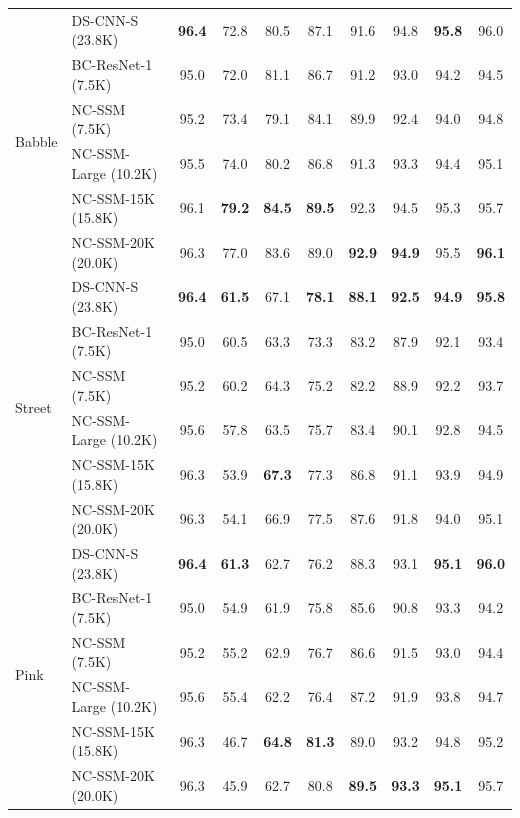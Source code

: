 \documentclass[journal]{IEEEtran}
\begin{document}
\begin{table}[t]
\begin{tabular}{ll|cccccccc}
\midrule
\multirow{6}{*}{Babble}
  & DS-CNN-S (23.8K)       & \textbf{96.4} & 72.8 & 80.5 & 87.1 & 91.6 & 94.8 & \textbf{95.8} & 96.0 \\
  & BC-ResNet-1 (7.5K)     & 95.0 & 72.0 & 81.1 & 86.7 & 91.2 & 93.0 & 94.2 & 94.5 \\
\cmidrule{2-10}
  & NC-SSM (7.5K)          & 95.2 & 73.4 & 79.1 & 84.1 & 89.9 & 92.4 & 94.0 & 94.8 \\
  & NC-SSM-Large (10.2K)   & 95.5 & 74.0 & 80.2 & 86.8 & 91.3 & 93.3 & 94.4 & 95.1 \\
  & NC-SSM-15K (15.8K) & 96.1 & \textbf{79.2} & \textbf{84.5} & \textbf{89.5} & 92.3 & 94.5 & 95.3 & 95.7 \\
  & NC-SSM-20K (20.0K) & 96.3 & 77.0 & 83.6 & 89.0 & \textbf{92.9} & \textbf{94.9} & 95.5 & \textbf{96.1} \\
\midrule
\multirow{6}{*}{Street}
  & DS-CNN-S (23.8K)       & \textbf{96.4} & \textbf{61.5} & 67.1 & \textbf{78.1} & \textbf{88.1} & \textbf{92.5} & \textbf{94.9} & \textbf{95.8} \\
  & BC-ResNet-1 (7.5K)     & 95.0 & 60.5 & 63.3 & 73.3 & 83.2 & 87.9 & 92.1 & 93.4 \\
\cmidrule{2-10}
  & NC-SSM (7.5K)          & 95.2 & 60.2 & 64.3 & 75.2 & 82.2 & 88.9 & 92.2 & 93.7 \\
  & NC-SSM-Large (10.2K)   & 95.6 & 57.8 & 63.5 & 75.7 & 83.4 & 90.1 & 92.8 & 94.5 \\
  & NC-SSM-15K (15.8K) & 96.3 & 53.9 & \textbf{67.3} & 77.3 & 86.8 & 91.1 & 93.9 & 94.9 \\
  & NC-SSM-20K (20.0K) & 96.3 & 54.1 & 66.9 & 77.5 & 87.6 & 91.8 & 94.0 & 95.1 \\
\midrule
\multirow{6}{*}{Pink}
  & DS-CNN-S (23.8K)       & \textbf{96.4} & \textbf{61.3} & 62.7 & 76.2 & 88.3 & 93.1 & \textbf{95.1} & \textbf{96.0} \\
  & BC-ResNet-1 (7.5K)     & 95.0 & 54.9 & 61.9 & 75.8 & 85.6 & 90.8 & 93.3 & 94.2 \\
\cmidrule{2-10}
  & NC-SSM (7.5K)          & 95.2 & 55.2 & 62.9 & 76.7 & 86.6 & 91.5 & 93.0 & 94.4 \\
  & NC-SSM-Large (10.2K)   & 95.6 & 55.4 & 62.2 & 76.4 & 87.2 & 91.9 & 93.8 & 94.7 \\
  & NC-SSM-15K (15.8K) & 96.3 & 46.7 & \textbf{64.8} & \textbf{81.3} & 89.0 & 93.2 & 94.8 & 95.2 \\
  & NC-SSM-20K (20.0K) & 96.3 & 45.9 & 62.7 & 80.8 & \textbf{89.5} & \textbf{93.3} & \textbf{95.1} & 95.7 \\
\bottomrule
\end{tabular}
\end{table}
\end{document}
